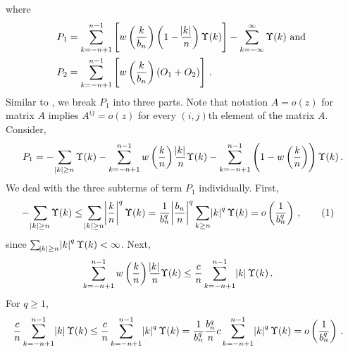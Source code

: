 \documentclass[11pt]{article}
\newcommand\numberthis{\addtocounter{equation}{1}\tag{\theequation}}
\theoremstyle{remark}
\begin{document}
%
where 
\begin{align*}
    P_1 &= \sum\limits_{k=-n+1}^{n-1}\left[w\left(\dfrac{k}{b_n}\right)\left(1-\dfrac{\abs{k}}{n}\right)\Upsilon(k) \right] - \sum\limits_{k=-\infty}^{\infty}\Upsilon(k) \textrm{ and }\\   
    P_2 &= \sum_{k=-n+1}^{n-1}\left[  w\left(\dfrac{k }{b_n}\right)\left(O_1 + O_2\right)\right]\,.
\end{align*}
%
%
Similar to \cite{hannan:1970}, we break $P_1$ into three parts. Note that notation $A = o(z)$ for matrix $A$  implies $A^{ij} = o(z)$ for every $(i,j)$th element of the matrix $A$. Consider,
\begin{equation}
\label{eq:P1_decomp}
P_1 = -\sum_{\abs{k}\geq n}\Upsilon(k)  -  \sum_{k = -n+1}^{n-1}w\left(\dfrac{k}{n}\right)\dfrac{\abs{k}}{n}\Upsilon(k)- \sum_{k = -n+1}^{n-1}\left(1-w\left(\dfrac{k}{n}\right)\right)\Upsilon(k)\,.  
\end{equation}
%
We deal with the three subterms of term $P_1$ individually. First,
%    
\begin{align*}
 {-\sum_{\abs{k}\geq n}\Upsilon(k)} &\leq  \sum_{\abs{k}\geq n} \abs{\dfrac{k}{n}}^q   \Upsilon(k) = \dfrac{1}{b_n^q}\abs{\dfrac{b_n}{n}}^q \sum_{k\geq n}\abs{k}^q  \Upsilon(k) = o\left(\dfrac{1}{b_n^q}\right)\,, \numberthis \label{eq:P1_first}
\end{align*}
%
since $\sum_{\abs{k}\geq n}\abs{k}^q \Upsilon(k)  < \infty$. Next,
%
\begin{align*}
 \sum_{k = -n+1}^{n-1}w\left(\dfrac{k}{n}\right)\dfrac{\abs{k}}{n}\Upsilon(k)   &\leq \dfrac{c}{n}\sum_{k = -n+1}^{n-1}\abs{k} \Upsilon(k)  \,.
\end{align*}
For $q\geq 1$,
\begin{align*}
\dfrac{c}{n}\sum_{k = -n+1}^{n-1}\abs{k}  \Upsilon(k) &\leq \dfrac{c}{n}\sum_{k = -n+1}^{n-1}\abs{k}^q  \Upsilon(k) = \dfrac{1}{b_n^q}\dfrac{b_n^q}{n} c\sum_{k = -n+1}^{n-1}\abs{k}^q  \Upsilon(k)  = o\left(\dfrac{1}{b_n^q}\right)\,.
\end{align*}
          
\end{document}
